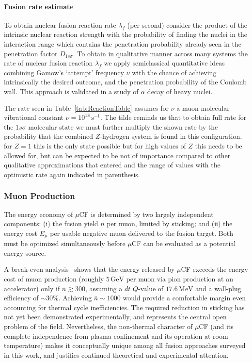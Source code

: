 \documentclass[particles,article,accept,pdftex,moreauthors]{Definitions/mdpi}
\newcommand{\rt}[1]{Table~\ref{#1}}
\begin{document}
\paragraph*{\bf Fusion rate estimate}
To obtain nuclear fusion reaction rate $\lambda_f$ (per second) consider the product of the intrinsic nuclear reaction strength with the probability of finding the nuclei in the interaction range which contains the penetration probability already seen in the penetration factor $D_{1s\sigma}$. To obtain in qualitative manner across many systems the rate of nuclear fusion reaction $\lambda_f$ we apply semiclassical quantitative ideas combining Gamow's `attempt' frequency $\nu$ with the chance of achieving intrinsically the desired outcome, and the penetration probability of the Coulomb wall. This approach is validated in a study of $\alpha$ decay of heavy nuclei.

The rate seen in \rt{tab:ReactionTable} assumes for $\nu$ a muon molecular vibrational constant $\nu= 10^{18}\,\mathrm{s}^{-1}$. The tilde reminds us that to obtain full rate for the $1s\sigma$ molecular state we must further multiply the shown rate by the probability that the combined $Z$-hydrogen system is found in this configuration, for $Z=1$ this is the only state possible but for high values of $Z$ this needs to be allowed for, but can be expected to be not of importance compared to other qualitative approximations that entered and the range of values with the optimistic rate again indicated in parenthesis.



\subsubsection{Muon Production}\label{sssec:muon_production}
The energy economy of $\mu$CF is determined by two largely independent components: (i) the fusion yield $\bar{n}$ per muon, limited by sticking; and (ii) the energy cost $E_\mu$ per usable negative muon delivered to the fusion target. Both must be optimized simultaneously before $\mu$CF can be evaluated as a potential energy source.

A break-even analysis~\cite{Rafelski:1990in} shows that the energy released by $\mu$CF exceeds the energy cost of muon production (roughly $5\,\mathrm{GeV}$ per muon via pion production at an accelerator) only if $\bar{n} \gtrsim 300$, assuming a $dt$ $Q$-value of $17.6\,\mathrm{MeV}$ and a wall-plug efficiency of $\sim$30\%. Achieving $\bar{n}\sim 1000$ would provide a comfortable margin even accounting for thermal cycle inefficiencies. The required reduction in sticking has not yet been demonstrated experimentally, and represents the central open problem of the field. Nevertheless, the non-thermal character of $\mu$CF (and its complete independence from plasma confinement and its operation at room temperature) makes it conceptually unique among all fusion approaches surveyed in this work, and justifies continued theoretical and experimental attention.
\end{document}
